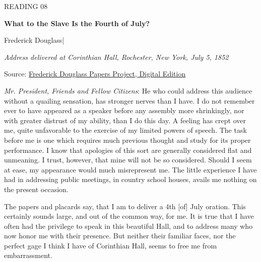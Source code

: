 \begingroup

\thispagestyle{fancy}
\label{article-08}
\begingroup\raggedright
\setlength{\parindent}{0pt}
{\fontsize{9}{12}\selectfont\color{headgrey}READING 08\par}
\vspace{4pt}
{\fontsize{24}{30}\selectfont\bfseries What to the Slave Is the Fourth of July?\par}
\vspace{7pt}
{\fontsize{12}{18}\selectfont Frederick Douglass\quad|\par}
\vspace{4pt}
{\fontsize{11}{16}\selectfont\itshape Address delivered at Corinthian Hall, Rochester, New York, July 5, 1852\par}
\vspace{4pt}
{\fontsize{9}{12.5}\selectfont\color{headgrey}Source: \href{https://frederickdouglasspapersproject.com/s/digitaledition/item/16068}{Frederick Douglass Papers Project, Digital Edition}\par}
\endgroup
\vspace{6pt}

\textit{Mr. President, Friends and Fellow Citizens}: He who could address this audience without a quailing sensation, has stronger nerves than I have. I do not remember ever to have appeared as a speaker before any assembly more shrinkingly, nor with greater distrust of my ability, than I do this day. A feeling has crept over me, quite unfavorable to the exercise of my limited powers of speech. The task before me is one which requires much previous thought and study for its proper performance. I know that apologies of this sort are generally considered flat and unmeaning. I trust, however, that mine will not be so considered. Should I seem at ease, my appearance would much misrepresent me. The little experience I have had in addressing public meetings, in country school houses, avails me nothing on the present occasion.\par

The papers and placards say, that I am to deliver a 4th [of] July oration. This certainly sounds large, and out of the common way, for me. It is true that I have often had the privilege to speak in this beautiful Hall, and to address many who now honor me with their presence. But neither their familiar faces, nor the perfect gage I think I have of Corinthian Hall, seems to free me from embarrassment.\par

